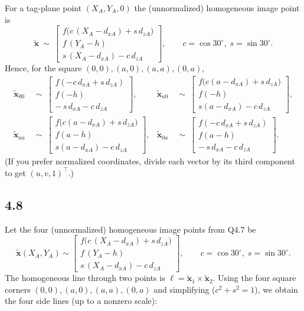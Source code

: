 \documentclass[12pt]{article}
\begin{document}
For a tag-plane point \((X_A,Y_A,0)\) the (unnormalized) homogeneous image point is
\[
\tilde{\mathbf{x}}
~\sim~
\begin{bmatrix}
f\big(c\,(X_A-d_{xA}) + s\,d_{zA}\big)\\[2pt]
f\,(Y_A-h)\\[2pt]
s\,(X_A-d_{xA}) - c\,d_{zA}
\end{bmatrix},
\qquad c=\cos 30^\circ,\; s=\sin 30^\circ .
\]
Hence, for the square \((0,0),(a,0),(a,a),(0,a)\),
\[
\boxed{
\begin{aligned}
\tilde{\mathbf{x}}_{00} &~\sim~
\begin{bmatrix}
f(-c\,d_{xA}+s\,d_{zA})\\[2pt]
f(-h)\\[2pt]
-\,s\,d_{xA}-c\,d_{zA}
\end{bmatrix},&
\tilde{\mathbf{x}}_{a0} &~\sim~
\begin{bmatrix}
f\big(c(a-d_{xA})+s\,d_{zA}\big)\\[2pt]
f(-h)\\[2pt]
s(a-d_{xA})-c\,d_{zA}
\end{bmatrix},\\[10pt]
\tilde{\mathbf{x}}_{aa} &~\sim~
\begin{bmatrix}
f\big(c(a-d_{xA})+s\,d_{zA}\big)\\[2pt]
f(a-h)\\[2pt]
s(a-d_{xA})-c\,d_{zA}
\end{bmatrix},&
\tilde{\mathbf{x}}_{0a} &~\sim~
\begin{bmatrix}
f(-c\,d_{xA}+s\,d_{zA})\\[2pt]
f(a-h)\\[2pt]
-\,s\,d_{xA}-c\,d_{zA}
\end{bmatrix}.
\end{aligned}
}
\]
(If you prefer normalized coordinates, divide each vector by its third component to get \((u,v,1)^\top\).)

\subsection*{4.8}
Let the four (unnormalized) homogeneous image points from Q4.7 be
\[
\tilde{\mathbf{x}}(X_A,Y_A)\sim
\begin{bmatrix}
f\big(c\,(X_A-d_{xA})+s\,d_{zA}\big)\\[2pt]
f\,(Y_A-h)\\[2pt]
s\,(X_A-d_{xA})-c\,d_{zA}
\end{bmatrix},
\qquad c=\cos30^\circ,\; s=\sin30^\circ .
\]
The homogeneous line through two points is \(\ell=\tilde{\mathbf{x}}_1\times\tilde{\mathbf{x}}_2\).
Using the four square corners \((0,0),(a,0),(a,a),(0,a)\) and simplifying
(\(c^2+s^2=1\)), we obtain the four side lines
(up to a nonzero scale):
\end{document}
